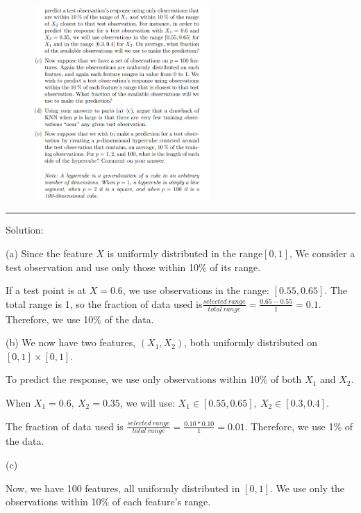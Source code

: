 \documentclass[
]{article}
\begin{document}
\begin{figure}

{\centering \includegraphics[width=0.6\textwidth,height=\textheight]{images/clipboard-3443800866.png}

}

\end{figure}

\begin{center}\rule{0.5\linewidth}{0.5pt}\end{center}

Solution:

(a) Since the feature \(X\) is uniformly distributed in the
range\([0,1]\), We consider a test observation and use only those within
10\% of its range.

If a test point is at \(𝑋 = 0.6\), we use observations in the range:
\([ 0.55 , 0.65]\). The total range is 1, so the fraction of data used
is\(\frac{selected\ range}{total\ range} = \frac{0.65 − 0.55}{1} = 0.1\).
Therefore, we use 10\% of the data.

(b) We now have two features, \((X_1,X_2)\), both uniformly distributed
on \([ 0 , 1] × [ 0 , 1]\).

To predict the response, we use only observations within 10\% of both
\(X_1\) and \(X_2\).

When \(X_1=0.6,\ X_2=0.35\), we will use:
\(X_1\in[0.55,0.65] ,\ X_2 \in [0.3,0.4]\).

The fraction of data used is
\(\frac{selected\ range}{total\ range} = \frac{0.10 * 0.10 }{1} = 0.01\).
Therefore, we use 1\% of the data.

(c)

Now, we have 100 features, all uniformly distributed in \([0,1]\). We
use only the observations within 10\% of each feature's range.
\end{document}

